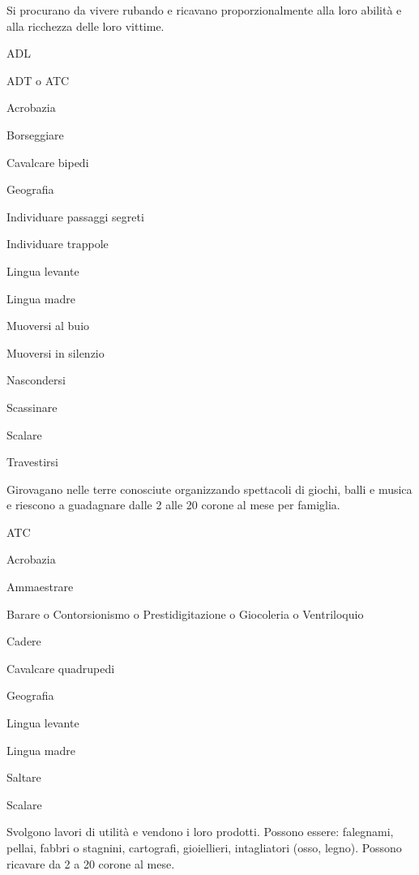 
Si procurano da vivere rubando e ricavano proporzionalmente
alla loro abilit\`a e alla ricchezza delle loro vittime.

\begin{abilist}
\item ADL
\item ADT o ATC
\item Acrobazia
\item Borseggiare
\item Cavalcare bipedi
\item Geografia 
\item Individuare passaggi segreti
\item Individuare trappole
\item Lingua levante
\item Lingua madre
\item Muoversi al buio
\item Muoversi in silenzio
\item Nascondersi
\item Scassinare
\item Scalare
\item Travestirsi
\end{abilist}


Girovagano nelle terre conosciute organizzando spettacoli di giochi, balli e
musica e riescono a guadagnare dalle 2 alle 20 corone al mese per famiglia.

\begin{abilist}
\item ATC
\item Acrobazia
\item Ammaestrare
\item Barare o Contorsionismo o Prestidigitazione o Giocoleria o
  Ventriloquio
\item Cadere
\item Cavalcare quadrupedi
\item Geografia
\item Lingua levante
\item Lingua madre
\item Saltare
\item Scalare
\end{abilist}


Svolgono lavori di utilit\`a e vendono i loro prodotti. Possono
essere: falegnami, pellai, fabbri o stagnini, cartografi, gioiellieri,
intagliatori (osso, legno). Possono ricavare da 2 a 20 corone al mese.

